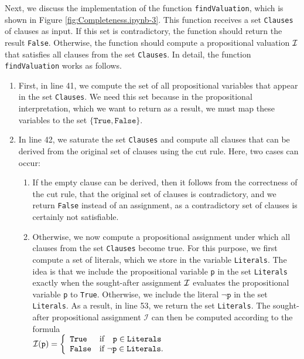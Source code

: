 Next, we discuss the implementation of the function \texttt{findValuation}, which is shown in
Figure \ref{fig:Completeness.ipynb-3}. This function receives a set \texttt{Clauses} of clauses as input.
If this set is contradictory, the function should return the result \texttt{False}.
Otherwise, the function should compute a propositional valuation $\mathcal{I}$ that satisfies all clauses from the set
\texttt{Clauses}. 
In detail, the function \texttt{findValuation} works as follows.
\begin{enumerate}
\item First, in line 41, we compute the set of all propositional variables that appear in the set
      \texttt{Clauses}. We need this set because in the
      propositional interpretation, which we want to return as a result, we must
      map these variables to the set $\{ \texttt{True}, \texttt{False} \}$.
\item In line 42, we saturate the set \texttt{Clauses} and compute all clauses that can be derived from the
      original set of clauses using the cut rule. Here, two cases can occur:
      \begin{enumerate}
      \item If the empty clause can be derived, then it follows from the correctness of the cut rule,
            that the original set of clauses is contradictory, and we return \texttt{False} instead of an assignment,
            as a contradictory set of clauses is certainly not satisfiable.
      \item Otherwise, we now compute a propositional assignment under which all clauses from
            the set \texttt{Clauses} become true. For this purpose, we first compute a set of
            literals, which we store in the variable \texttt{Literals}. The idea is that we
            include the propositional variable \texttt{p} in the set \texttt{Literals} exactly when
            the sought-after assignment $\mathcal{I}$ evaluates the propositional
            variable \texttt{p} to \texttt{True}. Otherwise, we include the
            literal $\neg \texttt{p}$ in the set \texttt{Literals}. As a result, in
            line 53, we return the set \texttt{Literals}. The sought-after propositional assignment
            $\mathcal{I}$ can then be computed according to the formula  
            \\[0.2cm]
            \hspace*{1.3cm}
            $\mathcal{I}(\texttt{p}) = \left\{
             \begin{array}{ll}
               \texttt{True}  & \mbox{if $\hspace*{0.25cm}\texttt{p} \in \texttt{Literals}$} \\
               \texttt{False} & \mbox{if $\neg\texttt{p} \in \texttt{Literals}$.}
             \end{array}\right.
            $
           

\end{enumerate}
\end{enumerate}
